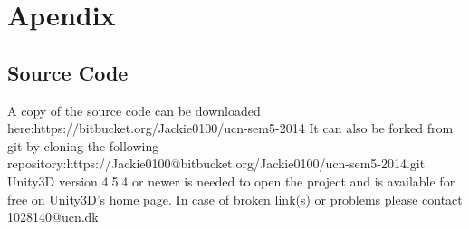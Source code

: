 \chapter*{Apendix}
\section*{Source Code}

A copy of the source code can be downloaded here:\newline https://bitbucket.org/Jackie0100/ucn-sem5-2014
\newline
\newline
It can also be forked from git by cloning the following repository:\newline https://Jackie0100@bitbucket.org/Jackie0100/ucn-sem5-2014.git
\newline
\newline
Unity3D version 4.5.4 or newer is needed to open the project and is available for free on Unity3D's home page.
\newline
\newline
In case of broken link(s) or problems please contact 1028140@ucn.dk
\newline
\newline
\newline